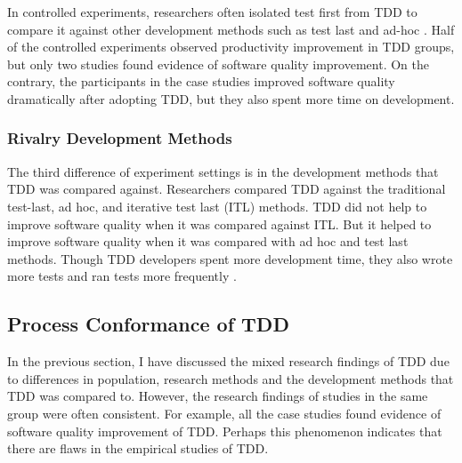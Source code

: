 \documentclass[smallextended]{svjour3}     %
\begin{document}
In controlled experiments, researchers often isolated test
first from TDD to compare it against other development 
methods such as test last and ad-hoc \cite{Muller:02,Matjaz:03,
Erdogmus:05,George:03,Geras:04}. Half of the controlled 
experiments \cite{George:03,Kaufmann:03,Erdogmus:05} observed 
productivity improvement in TDD groups, but only two studies 
found evidence of software quality improvement. On the contrary, 
the participants in the case studies improved software quality 
dramatically after adopting TDD, but they also spent more time 
on development.  

\subsubsection{Rivalry Development Methods}
The third difference of experiment settings is in the 
development methods that TDD was compared against. Researchers 
compared TDD against the traditional test-last\cite{Kaufmann:03,Geras:04}, 
ad hoc\cite{Muller:02,George:03}, and iterative test last 
(ITL) \cite{Matjaz:03,Erdogmus:05} methods. TDD did not help to 
improve software quality when it was compared against ITL. 
But it helped to improve software quality when it was compared 
with ad hoc and test last methods. Though TDD developers 
spent more development time, they also wrote more tests 
\cite{George:03,Erdogmus:05} and ran tests more frequently
\cite{Geras:04}.

\subsection{Process Conformance of TDD}
In the previous section, I have discussed the mixed research 
findings of TDD due to differences in population, research 
methods and the development methods that TDD was compared 
to. However, the research findings of studies in the same group  
were often consistent. For example, all the case studies found 
evidence of software quality improvement of TDD. Perhaps this 
phenomenon indicates that there are flaws in the empirical
studies of TDD. 
\end{document}
